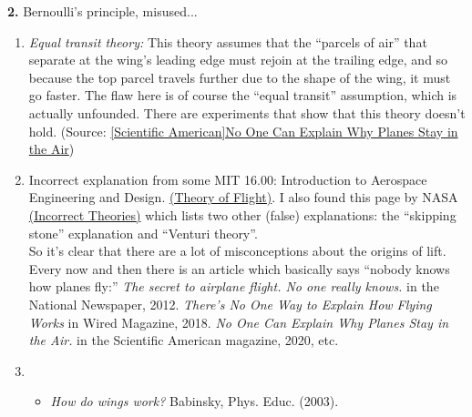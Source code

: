 \documentclass[11pt]{article}
\begin{document}
\noindent \textbf{2.} Bernoulli's principle, misused...
\begin{enumerate}
	\item \textit{Equal transit theory:} This theory assumes that the ``parcels of air'' that separate at the wing's leading edge must rejoin at the trailing edge, and so because the top parcel travels further due to the shape of the wing, it must go faster. The flaw here is of course the ``equal transit'' assumption, which is actually unfounded. There are experiments that show that this theory doesn't hold.  (Source: \href{https://www.scientificamerican.com/article/no-one-can-explain-why-planes-stay-in-the-air/#:~:text=According 20to 20the 20most 20common,time 2C 20it 20must 20go 20faster.}{[Scientific American]No One Can Explain Why Planes Stay in the Air})
	
	
	\item Incorrect explanation from some MIT 16.00: Introduction to Aerospace Engineering and Design. \href{https://web.mit.edu/16.00/www/aec/flight.html#:~:text=Air 20flowing 20over 20an 20airfoil 20will 20decrease 20in 20pressure.,This 20pressure 20force 20is 20lift.}{(Theory of Flight)}. 
	I also found this page by NASA \href{https://www.grc.nasa.gov/WWW/k-12/airplane/wrong1.html}{(Incorrect Theories)} which lists two other (false) explanations: the ``skipping stone'' explanation and ``Venturi theory''. \\
	
	
	So it's clear that there are a lot of misconceptions about the origins of lift. Every now and then there is an article which basically says ``nobody knows how planes fly:'' \textit{The secret to airplane flight. No one really knows.} in the National Newspaper, 2012. \textit{There's No One Way to Explain How Flying Works} in Wired Magazine, 2018.
	\textit{No One Can Explain Why Planes Stay in the Air.} in the Scientific American magazine, 2020, etc. 
	
	
	\item 
	\begin{itemize}
		\item \textit{How do wings work?} Babinsky, Phys. Educ. (2003).\\
		

\end{itemize}
\end{enumerate}
\end{document}
